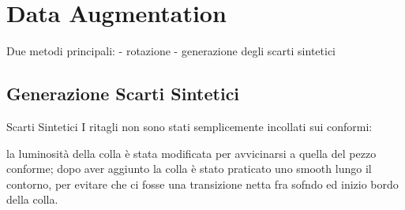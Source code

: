 
\section {Data Augmentation}
Due metodi principali:
 - rotazione
 - generazione degli scarti sintetici

\subsection {Generazione Scarti Sintetici}


Scarti Sintetici
 I ritagli non sono stati semplicemente incollati sui conformi:

 la luminosità della colla è stata modificata per avvicinarsi a quella del pezzo conforme;
 dopo aver aggiunto la colla è stato praticato uno smooth lungo il contorno, per evitare che ci fosse una transizione netta fra sofndo ed inizio bordo della colla.







































